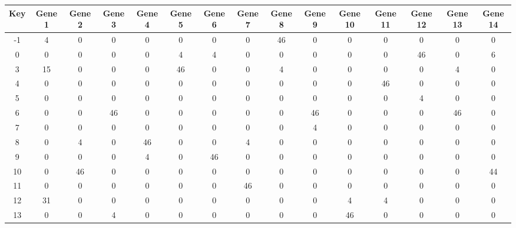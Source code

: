 \begin{tabular}{|c|c|c|c|c|c|c|c|c|c|c|c|c|c|c|}
\hline
Key & Gene 1 & Gene 2 & Gene 3 & Gene 4 & Gene 5 & Gene 6 & Gene 7 & Gene 8 & Gene 9 & Gene 10 & Gene 11 & Gene 12 & Gene 13 & Gene 14 \\
\hline
-1 & 4 & 0 & 0 & 0 & 0 & 0 & 0 & 46 & 0 & 0 & 0 & 0 & 0 & 0 \\
0 & 0 & 0 & 0 & 0 & 4 & 4 & 0 & 0 & 0 & 0 & 0 & 46 & 0 & 6 \\
3 & 15 & 0 & 0 & 0 & 46 & 0 & 0 & 4 & 0 & 0 & 0 & 0 & 4 & 0 \\
4 & 0 & 0 & 0 & 0 & 0 & 0 & 0 & 0 & 0 & 0 & 46 & 0 & 0 & 0 \\
5 & 0 & 0 & 0 & 0 & 0 & 0 & 0 & 0 & 0 & 0 & 0 & 4 & 0 & 0 \\
6 & 0 & 0 & 46 & 0 & 0 & 0 & 0 & 0 & 46 & 0 & 0 & 0 & 46 & 0 \\
7 & 0 & 0 & 0 & 0 & 0 & 0 & 0 & 0 & 4 & 0 & 0 & 0 & 0 & 0 \\
8 & 0 & 4 & 0 & 46 & 0 & 0 & 4 & 0 & 0 & 0 & 0 & 0 & 0 & 0 \\
9 & 0 & 0 & 0 & 4 & 0 & 46 & 0 & 0 & 0 & 0 & 0 & 0 & 0 & 0 \\
10 & 0 & 46 & 0 & 0 & 0 & 0 & 0 & 0 & 0 & 0 & 0 & 0 & 0 & 44 \\
11 & 0 & 0 & 0 & 0 & 0 & 0 & 46 & 0 & 0 & 0 & 0 & 0 & 0 & 0 \\
12 & 31 & 0 & 0 & 0 & 0 & 0 & 0 & 0 & 0 & 4 & 4 & 0 & 0 & 0 \\
13 & 0 & 0 & 4 & 0 & 0 & 0 & 0 & 0 & 0 & 46 & 0 & 0 & 0 & 0 \\
\hline
\end{tabular}